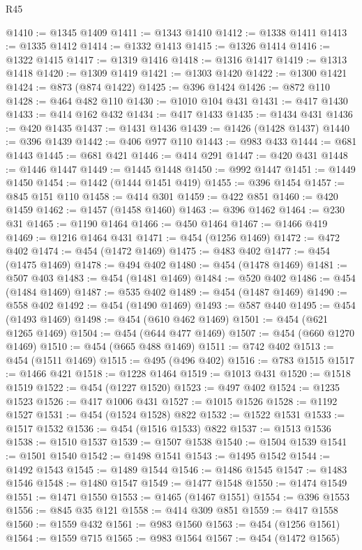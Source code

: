\begin{lexlean}{R45}
\begin{coremodule}
@1410 := @1345 @1409
@1411 := @1343 @1410
@1412 := @1338 @1411
@1413 := @1335 @1412
@1414 := @1332 @1413
@1415 := @1326 @1414
@1416 := @1322 @1415
@1417 := @1319 @1416
@1418 := @1316 @1417
@1419 := @1313 @1418
@1420 := @1309 @1419
@1421 := @1303 @1420
@1422 := @1300 @1421
@1424 := @873 (@874 @1422)
@1425 := @396 @1424
@1426 := @872 @110
@1428 := @464 @482 @110
@1430 := @1010 @104 @431
@1431 := @417 @1430
@1433 := @414 @162 @432
@1434 := @417 @1433
@1435 := @1434 @431
@1436 := @420 @1435
@1437 := @1431 @1436
@1439 := @1426 (@1428 @1437)
@1440 := @396 @1439
@1442 := @406 @977 @110
@1443 := @983 @433
@1444 := @681 @1443
@1445 := @681 @421
@1446 := @414 @291
@1447 := @420 @431
@1448 := @1446 @1447
@1449 := @1445 @1448
@1450 := @992 @1447
@1451 := @1449 @1450
@1454 := @1442 (@1444 @1451 @419)
@1455 := @396 @1454
@1457 := @845 @151 @110
@1458 := @414 @301
@1459 := @422 @851
@1460 := @420 @1459
@1462 := @1457 (@1458 @1460)
@1463 := @396 @1462
@1464 := @230 @31
@1465 := @1190 @1464
@1466 := @450 @1464
@1467 := @1466 @419
@1469 := @1216 @1464 @431
@1471 := @454 (@1256 @1469)
@1472 := @472 @402
@1474 := @454 (@1472 @1469)
@1475 := @483 @402
@1477 := @454 (@1475 @1469)
@1478 := @494 @402
@1480 := @454 (@1478 @1469)
@1481 := @507 @403
@1483 := @454 (@1481 @1469)
@1484 := @520 @402
@1486 := @454 (@1484 @1469)
@1487 := @535 @402
@1489 := @454 (@1487 @1469)
@1490 := @558 @402
@1492 := @454 (@1490 @1469)
@1493 := @587 @440
@1495 := @454 (@1493 @1469)
@1498 := @454 (@610 @462 @1469)
@1501 := @454 (@621 @1265 @1469)
@1504 := @454 (@644 @477 @1469)
@1507 := @454 (@660 @1270 @1469)
@1510 := @454 (@665 @488 @1469)
@1511 := @742 @402
@1513 := @454 (@1511 @1469)
@1515 := @495 (@496 @402)
@1516 := @783 @1515
@1517 := @1466 @421
@1518 := @1228 @1464
@1519 := @1013 @431
@1520 := @1518 @1519
@1522 := @454 (@1227 @1520)
@1523 := @497 @402
@1524 := @1235 @1523
@1526 := @417 @1006 @431
@1527 := @1015 @1526
@1528 := @1192 @1527
@1531 := @454 (@1524 @1528) @822
@1532 := @1522 @1531
@1533 := @1517 @1532
@1536 := @454 (@1516 @1533) @822
@1537 := @1513 @1536
@1538 := @1510 @1537
@1539 := @1507 @1538
@1540 := @1504 @1539
@1541 := @1501 @1540
@1542 := @1498 @1541
@1543 := @1495 @1542
@1544 := @1492 @1543
@1545 := @1489 @1544
@1546 := @1486 @1545
@1547 := @1483 @1546
@1548 := @1480 @1547
@1549 := @1477 @1548
@1550 := @1474 @1549
@1551 := @1471 @1550
@1553 := @1465 (@1467 @1551)
@1554 := @396 @1553
@1556 := @845 @35 @121
@1558 := @414 @309 @851
@1559 := @417 @1558
@1560 := @1559 @432
@1561 := @983 @1560
@1563 := @454 (@1256 @1561)
@1564 := @1559 @715
@1565 := @983 @1564
@1567 := @454 (@1472 @1565)

\end{coremodule}
\end{lexlean}
